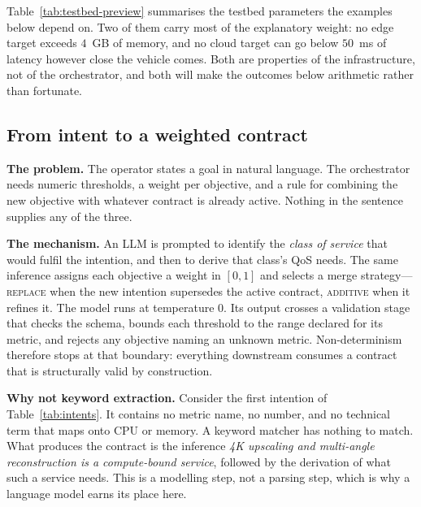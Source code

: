 \documentclass[conference]{IEEEtran}
\begin{document}
Table~\ref{tab:testbed-preview} summarises the testbed parameters the examples
below depend on. Two of them carry most of the explanatory weight: no edge
target exceeds $4$~GB of memory, and no cloud target can go below $50$~ms of
latency however close the vehicle comes. Both are properties of the
infrastructure, not of the orchestrator, and both will make the outcomes below
arithmetic rather than fortunate.

\subsection{From intent to a weighted contract}
\label{sec:intent}

\textbf{The problem.} The operator states a goal in natural language. The
orchestrator needs numeric thresholds, a weight per objective, and a rule for
combining the new objective with whatever contract is already active. Nothing
in the sentence supplies any of the three.

\textbf{The mechanism.} An LLM is prompted to identify the \emph{class of
service} that would fulfil the intention, and then to derive that class's QoS
needs. The same inference assigns each objective a weight in $[0,1]$ and
selects a merge strategy---\textsc{replace} when the new intention supersedes
the active contract, \textsc{additive} when it refines it. The model runs at
temperature $0$. Its output crosses a validation stage that checks the schema,
bounds each threshold to the range declared for its metric, and rejects any
objective naming an unknown metric. Non-determinism therefore stops at that
boundary: everything downstream consumes a contract that is structurally
valid by construction.

\textbf{Why not keyword extraction.} Consider the first intention of
Table~\ref{tab:intents}. It contains no metric name, no number, and no
technical term that maps onto CPU or memory. A keyword matcher has nothing to
match. What produces the contract is the inference \emph{4K upscaling and
multi-angle reconstruction is a compute-bound service}, followed by the
derivation of what such a service needs. This is a modelling step, not a
parsing step, which is why a language model earns its place here.
\end{document}

